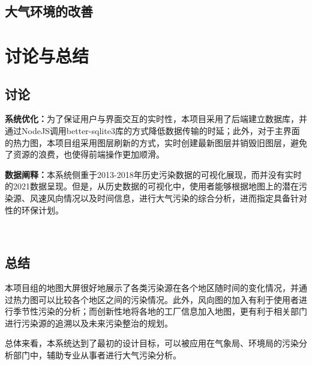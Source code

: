 \documentclass[UTF8]{ctexrep}
\begin{document}
    \subsection{大气环境的改善}

    \section{讨论与总结}
    \subsection{讨论}
    \textbf{系统优化：}为了保证用户与界面交互的实时性，本项目采用了后端建立数据库，并通过NodeJS调用better-sqlite3库的方式降低数据传输的时延；此外，对于主界面的热力图，本项目组采用图层刷新的方式，实时创建最新图层并销毁旧图层，避免了资源的浪费，也使得前端操作更加顺滑。
    
    \textbf{数据阐释：}本系统侧重于2013-2018年历史污染数据的可视化展现，而并没有实时的2021数据呈现。但是，从历史数据的可视化中，使用者能够根据地图上的潜在污染源、风速风向情况以及时间信息，进行大气污染的综合分析，进而指定具备针对性的环保计划。
     
    ~\\ 
    \subsection{总结}
    本项目组的地图大屏很好地展示了各类污染源在各个地区随时间的变化情况，并通过热力图可以比较各个地区之间的污染情况。此外，风向图的加入有利于使用者进行季节性污染的分析；而创新性地将各地的工厂信息加入地图，更有利于相关部门进行污染源的追溯以及未来污染整治的规划。
    
    总体来看，本系统达到了最初的设计目标，可以被应用在气象局、环境局的污染分析部门中，辅助专业从事者进行大气污染分析。
\end{document}
